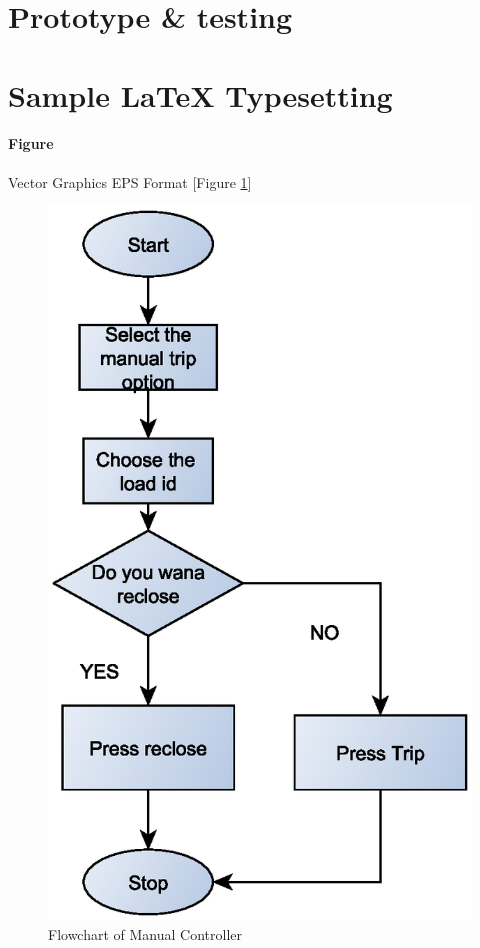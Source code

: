 \section{Prototype \& testing}

\section*{Sample LaTeX Typesetting}


\paragraph*{Figure} Vector Graphics EPS Format [Figure \ref{fig:fcmc1}]
\begin{figure}[H]
	\begin{center}
		\includegraphics[scale=0.5]{Figures/manualtrip.eps}
		\caption{Flowchart of Manual Controller}
		\label{fig:fcmc1}
	\end{center}
\end{figure}


